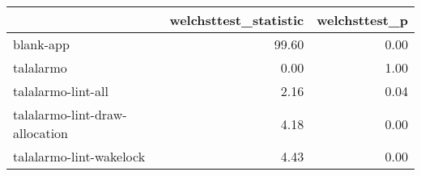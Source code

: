 \begin{tabular}{lrr}
\toprule
{} &  welchsttest\_statistic &  welchsttest\_p \\
\midrule
blank-app                      &                  99.60 &           0.00 \\
talalarmo                      &                   0.00 &           1.00 \\
talalarmo-lint-all             &                   2.16 &           0.04 \\
talalarmo-lint-draw-allocation &                   4.18 &           0.00 \\
talalarmo-lint-wakelock        &                   4.43 &           0.00 \\
\bottomrule
\end{tabular}
